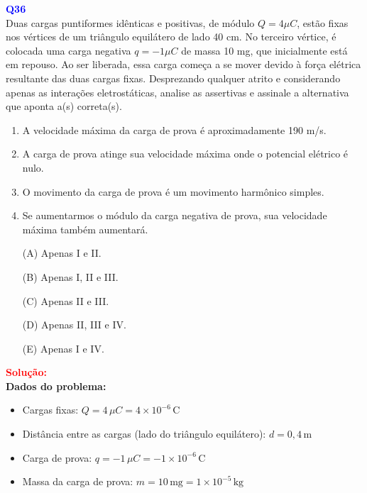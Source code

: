 \documentclass[a4paper,12pt]{article}
\begin{document}
\begin{flushleft}
\textbf{\textcolor{blue}{\Large Q36}}\\

Duas cargas puntiformes idênticas e positivas, de módulo \( Q = 4 \mu C \), estão fixas nos vértices de um triângulo 
equilátero de lado 40 cm. No terceiro vértice, é colocada uma carga negativa \( q = -1 \mu C \) de massa 10 mg, que inicialmente 
está em repouso. Ao ser liberada, essa carga começa a se mover devido à força elétrica resultante das duas cargas fixas. 
Desprezando qualquer atrito e considerando apenas as interações eletrostáticas, analise as assertivas e assinale 
a alternativa que aponta a(s) correta(s).

\begin{enumerate}
    \item A velocidade máxima da carga de prova é aproximadamente 190 m/s.
    \item A carga de prova atinge sua velocidade máxima onde o potencial elétrico é nulo.
    \item O movimento da carga de prova é um movimento harmônico simples.
    \item Se aumentarmos o módulo da carga negativa de prova, sua velocidade máxima também aumentará.
\end{enumerate}

\begin{itemize}
    \item[(A)] Apenas I e II.
    \item[(B)] Apenas I, II e III.
    \item[(C)] Apenas II e III.
    \item[(D)] Apenas II, III e IV.
    \item[(E)] Apenas I e IV.
\end{itemize}

\vspace{0.5cm}

\textcolor{red}{\textbf{Solução:}}\\

\textbf{Dados do problema:}

\begin{itemize}
    \item Cargas fixas: \( Q = 4\,\mu C = 4 \times 10^{-6}\,\mathrm{C} \)
    \item Distância entre as cargas (lado do triângulo equilátero): \( d = 0,4\,\mathrm{m} \)
    \item Carga de prova: \( q = -1\,\mu C = -1 \times 10^{-6}\,\mathrm{C} \)
    \item Massa da carga de prova: \( m = 10\,\mathrm{mg} = 1 \times 10^{-5}\,\mathrm{kg} \)
\end{itemize}


\end{flushleft}
\end{document}

